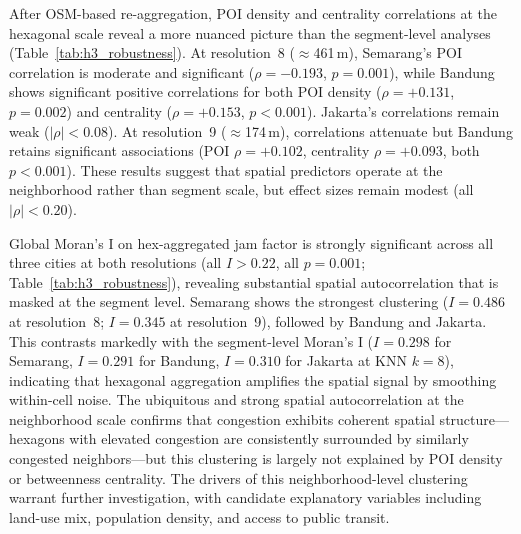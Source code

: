 \documentclass[review,authoryear]{elsarticle}
\begin{document}
After OSM-based re-aggregation, POI density and centrality correlations at the hexagonal scale reveal a more nuanced picture than the segment-level analyses (Table~\ref{tab:h3_robustness}). At resolution~8 ($\approx$461\,m), Semarang's POI correlation is moderate and significant ($\rho = -0.193$, $p = 0.001$), while Bandung shows significant positive correlations for both POI density ($\rho = +0.131$, $p = 0.002$) and centrality ($\rho = +0.153$, $p < 0.001$). Jakarta's correlations remain weak ($|\rho| < 0.08$). At resolution~9 ($\approx$174\,m), correlations attenuate but Bandung retains significant associations (POI $\rho = +0.102$, centrality $\rho = +0.093$, both $p < 0.001$). These results suggest that spatial predictors operate at the neighborhood rather than segment scale, but effect sizes remain modest (all $|\rho| < 0.20$).

Global Moran's I on hex-aggregated jam factor is strongly significant across all three cities at both resolutions (all $I > 0.22$, all $p = 0.001$; Table~\ref{tab:h3_robustness}), revealing substantial spatial autocorrelation that is masked at the segment level. Semarang shows the strongest clustering ($I = 0.486$ at resolution~8; $I = 0.345$ at resolution~9), followed by Bandung and Jakarta. This contrasts markedly with the segment-level Moran's I ($I = 0.298$ for Semarang, $I = 0.291$ for Bandung, $I = 0.310$ for Jakarta at KNN $k{=}8$), indicating that hexagonal aggregation amplifies the spatial signal by smoothing within-cell noise. The ubiquitous and strong spatial autocorrelation at the neighborhood scale confirms that congestion exhibits coherent spatial structure---hexagons with elevated congestion are consistently surrounded by similarly congested neighbors---but this clustering is largely not explained by POI density or betweenness centrality. The drivers of this neighborhood-level clustering warrant further investigation, with candidate explanatory variables including land-use mix, population density, and access to public transit.
\end{document}
